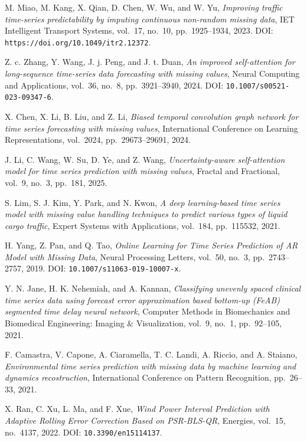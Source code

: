 \begin{enumerate}[label={[S\arabic*]}]
    \item %
    M. Miao, M. Kang, X. Qian, D. Chen, W. Wu, and W. Yu, \textit{Improving traffic time-series predictability by imputing continuous non-random missing data}, IET Intelligent Transport Systems, vol.~17, no.~10, pp.~1925–1934, 2023. DOI: \texttt{https://doi.org/10.1049/itr2.12372}.
    \item %
    Z. c. Zhang, Y. Wang, J. j. Peng, and J. t. Duan, \textit{An improved self-attention for long-sequence time-series data forecasting with missing values}, Neural Computing and Applications, vol.~36, no.~8, pp.~3921–3940, 2024. DOI: \texttt{10.1007/s00521-023-09347-6}.
    \item %
    X. Chen, X. Li, B. Liu, and Z. Li, \textit{Biased temporal convolution graph network for time series forecasting with missing values}, International Conference on Learning Representations, vol.~2024, pp.~29673–29691, 2024.
    \item %
    J. Li, C. Wang, W. Su, D. Ye, and Z. Wang, \textit{Uncertainty-aware self-attention model for time series prediction with missing values}, Fractal and Fractional, vol.~9, no.~3, pp.~181, 2025.
    \item %
    S. Lim, S. J. Kim, Y. Park, and N. Kwon, \textit{A deep learning-based time series model with missing value handling techniques to predict various types of liquid cargo traffic}, Expert Systems with Applications, vol.~184, pp.~115532, 2021.
    \item %
    H. Yang, Z. Pan, and Q. Tao, \textit{Online Learning for Time Series Prediction of AR Model with Missing Data}, Neural Processing Letters, vol.~50, no.~3, pp.~2743–2757, 2019. DOI: \texttt{10.1007/s11063-019-10007-x}.
    \item %
    Y. N. Jane, H. K. Nehemiah, and A. Kannan, \textit{Classifying unevenly spaced clinical time series data using forecast error approximation based bottom-up (FeAB) segmented time delay neural network}, Computer Methods in Biomechanics and Biomedical Engineering: Imaging \& Visualization, vol.~9, no.~1, pp.~92–105, 2021.
    \item %
    F. Camastra, V. Capone, A. Ciaramella, T. C. Landi, A. Riccio, and A. Staiano, \textit{Environmental time series prediction with missing data by machine learning and dynamics recostruction}, International Conference on Pattern Recognition, pp.~26–33, 2021.
    \item %
    X. Ran, C. Xu, L. Ma, and F. Xue, \textit{Wind Power Interval Prediction with Adaptive Rolling Error Correction Based on PSR-BLS-QR}, Energies, vol.~15, no.~4137, 2022. DOI: \texttt{10.3390/en15114137}.

\end{enumerate}
